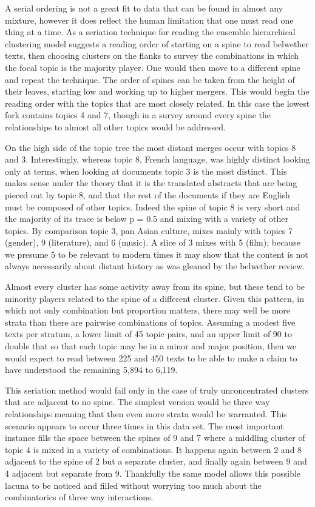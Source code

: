 \documentclass[]{book}
\theoremstyle{definition}
\theoremstyle{definition}
\theoremstyle{definition}
\theoremstyle{remark}
\begin{document}
A serial ordering is not a great fit to data that can be found in almost
any mixture, however it does reflect the human limitation that one must
read one thing at a time. As a seriation technique for reading the
ensemble hierarchical clustering model suggests a reading order of
starting on a spine to read belwether texts, then choosing clusters on
the flanks to survey the combinations in which the focal topic is the
majority player. One would then move to a different spine and repeat the
technique. The order of spines can be taken from the height of their
leaves, starting low and working up to higher mergers. This would begin
the reading order with the topics that are most closely related. In this
case the lowest fork contains topics 4 and 7, though in a survey around
every spine the relationships to almost all other topics would be
addressed.

On the high side of the topic tree the most distant merges occur with
topics 8 and 3. Interestingly, whereas topic 8, French language, was
highly distinct looking only at terms, when looking at documents topic 3
is the most distinct. This makes sense under the theory that it is the
translated abstracts that are being pieced out by topic 8, and that the
rest of the documents if they are English must be composed of other
topics. Indeed the spine of topic 8 is very short and the majority of
its trace is below p = 0.5 and mixing with a variety of other topics. By
comparison topic 3, pan Asian culture, mixes mainly with topics 7
(gender), 9 (literature), and 6 (music). A slice of 3 mixes with 5
(film); because we presume 5 to be relevant to modern times it may show
that the content is not always necessarily about distant history as was
gleaned by the belwether review.

Almost every cluster has some activity away from its spine, but these
tend to be minority players related to the spine of a different cluster.
Given this pattern, in which not only combination but proportion
matters, there may well be more strata than there are pairwise
combinations of topics. Assuming a modest five texts per stratum, a
lower limit of 45 topic pairs, and an upper limit of 90 to double that
so that each topic may be in a minor and major position, then we would
expect to read between 225 and 450 texts to be able to make a claim to
have understood the remaining 5,894 to 6,119.

This seriation method would fail only in the case of truly
unconcentrated clusters that are adjacent to no spine. The simplest
version would be three way relationships meaning that then even more
strata would be warranted. This scenario appears to occur three times in
this data set. The most important instance fills the space between the
spines of 9 and 7 where a middling cluster of topic 4 is mixed in a
variety of combinations. It happens again between 2 and 8 adjacent to
the spine of 2 but a separate cluster, and finally again between 9 and 4
adjacent but separate from 9. Thankfully the same model allows this
possible lacuna to be noticed and filled without worrying too much about
the combinatorics of three way interactions.
\end{document}
